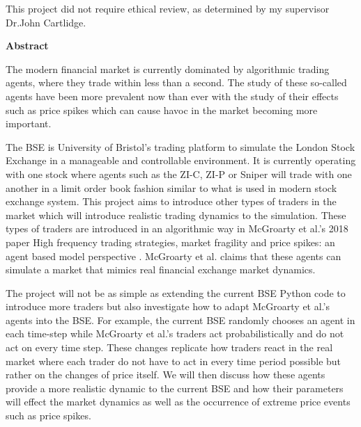 \documentclass[ %
                    author={Dhammatorn Riewcharoon (dr17549)},
                supervisor={Dr.John Cartlidge},
                    degree={BSc},
                     title={Introducing realistic trading dynamics to the Bristol Stock Exchange},
                  subtitle={},
                      year={2020} ]{dissertation}
\begin{document}
\maketitle
\frontmatter
\makedecl

\newpage

\thispagestyle{plain}
This project did not require ethical review, as determined by my supervisor Dr.John Cartlidge. 
\newpage
\thispagestyle{plain}
\begin{center}
    \vspace{0.9cm}
    \textbf{Abstract}
\end{center}
The modern financial market is currently dominated by algorithmic trading agents, where they trade within less than a second. The study of these so-called agents have been more prevalent now than ever with the study of their effects such as price spikes which can cause havoc in the market becoming more important. 

The BSE is University of Bristol’s trading platform to simulate the London Stock Exchange in a manageable and controllable environment. It is currently operating with one stock where agents such as the ZI-C, ZI-P or Sniper will trade with one another in a limit order book fashion similar to what is used in modern stock exchange system. This project aims to introduce other types of traders in the market which will introduce realistic trading dynamics to the simulation. These types of traders are introduced in an algorithmic way in McGroarty et al.’s 2018 paper High frequency trading strategies, market fragility and price spikes: an agent based model perspective \cite{McGroarty}. McGroarty et al. claims that these agents can simulate a market that mimics real financial exchange market dynamics.

The project will not be as simple as extending the current BSE Python code to introduce more traders but also investigate how to adapt McGroarty et al.’s agents into the BSE. For example, the current BSE randomly chooses an agent in each time-step while McGroarty et al.’s traders act probabilistically and do not act on every time step. These changes replicate how traders react in the real market where each trader do not have to act in every time period possible but rather on the changes of price itself. We will then discuss how these agents provide a more realistic dynamic to the current BSE and how their parameters will effect the market dynamics as well as the occurrence of extreme price events such as price spikes. 
\newpage
\end{document}
